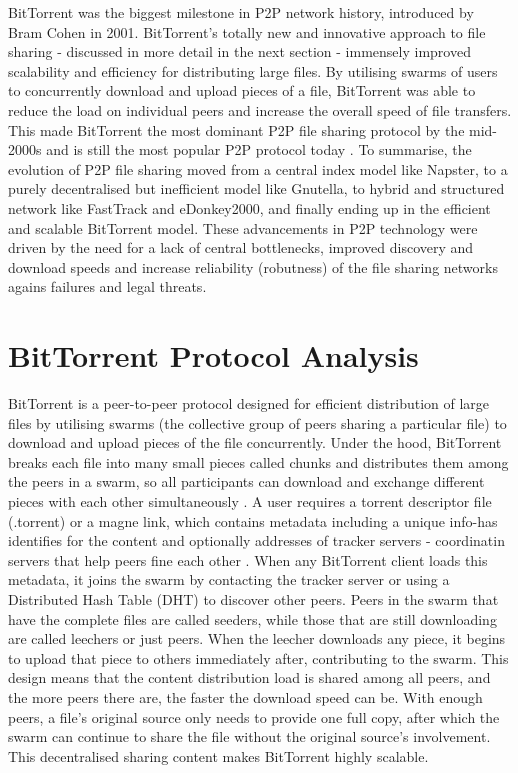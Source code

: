 \documentclass[12pt,a4paper]{report}
\begin{document}
BitTorrent was the biggest milestone in P2P network history, introduced by Bram Cohen in 2001. BitTorrent's totally new and innovative approach to file sharing - discussed in more detail in the next section - immensely improved scalability and efficiency for distributing large files. By utilising swarms of users to concurrently download and upload pieces of a file, BitTorrent was able to reduce the load on individual peers and increase the overall speed of file transfers. This made BitTorrent the most dominant P2P file sharing protocol by the mid-2000s and is still the most popular P2P protocol today \cite{BitTorrent-most-popular}. To summarise, the evolution of P2P file sharing moved from a central index model like Napster, to a purely decentralised but inefficient model like Gnutella, to hybrid and structured network like FastTrack and eDonkey2000, and finally ending up in the efficient and scalable BitTorrent model. These advancements in P2P technology were driven by the need for a lack of central bottlenecks, improved discovery and download speeds and increase reliability (robutness) of the file sharing networks agains failures and legal threats.


\section{BitTorrent Protocol Analysis}
BitTorrent is a peer-to-peer protocol designed for efficient distribution of large files by utilising swarms (the collective group of peers sharing a particular file) to download and upload pieces of the file concurrently. Under the hood, BitTorrent breaks each file into many small pieces called chunks and distributes them among the peers in a swarm, so all participants can download and exchange different pieces with each other simultaneously \cite{bep_0003}. A user requires a torrent descriptor file (.torrent) or a magne link, which contains metadata including a unique info-has identifies for the content and optionally addresses of tracker servers - coordinatin servers that help peers fine each other \cite{bep_0003}. When any BitTorrent client loads this metadata, it joins the swarm by contacting the tracker server or using a Distributed Hash Table (DHT) to discover other peers. Peers in the swarm that have the complete files are called seeders, while those that are still downloading are called leechers or just peers. When the leecher downloads any piece, it begins to upload that piece to others immediately after, contributing to the swarm. This design means that the content distribution load is shared among all peers, and the more peers there are, the faster the download speed can be. With enough peers, a file's original source only needs to provide one full copy, after which the swarm can continue to share the file without the original source's involvement. This decentralised sharing content makes BitTorrent highly scalable.
\end{document}
